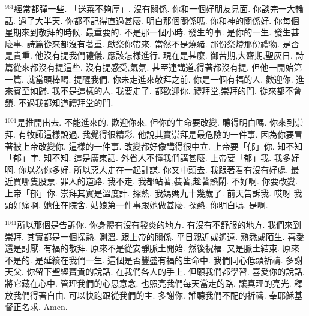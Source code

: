 \documentclass{book}
\begin{document}
$^{961}$經常都彈一些.
「送菜不夠厚」.
沒有關係.
你和一個好朋友見面.
你談完一大輪話.
過了大半天.
你都不記得直過甚麼.
明白那個關係嗎.
你和神的關係好.
你每個星期來到敬拜的時候.
最重要的.
不是那一個小時.
發生的事.
是你的一生.
發生甚麼事.
詩篇從來都沒有著重.
獻祭你帶來.
當然不是燒豬.
那份祭燈那份禮物.
是否是貴重.
他沒有提我們禮儀.
應該怎樣進行.
現在是甚麼.
御苦期,大齋期,聖灰日.
詩篇從來都沒有提這些.
沒有提感受,氣氛.
甚至連講道,得著都沒有提.
但他一開始第一篇.
就當頭棒喝.
提醒我們.
你未走進來敬拜之前.
你是一個有福的人.
歡迎你.
進來賓至如歸.
我不是這樣的人.
我要走了.
都歡迎你.
禮拜堂,崇拜的門.
從來都不會鎖.
不過我都知道禮拜堂的門.

$^{1001}$是推開出去.
不能進來的.
歡迎你來.
但你的生命要改變.
聽得明白嗎.
你來到崇拜.
有牧師這樣說過.
我覺得很精彩.
他說其實崇拜是最危險的一件事.
因為你要冒著被上帝改變你.
這樣的一件事.
改變都好像講得很中立.
上帝要「郁」你.
知不知「郁」字.
知不知.
這是廣東話.
外省人不懂我們講甚麼.
上帝要「郁」我.
我多好啊.
你以為你多好.
所以惡人走在一起計謀.
你又中頭去.
我跟著看有沒有好處.
最近買哪隻股票.
罪人的道路.
我不走.
我都站著,裝著,趁著熱鬧.
不好啊.
你要改變.
上帝「郁」你.
崇拜其實是溫度計.
探熱.
我媽媽九十幾歲了.
前天告訴我.
哎呀 我頭好痛啊.
她住在院舍.
姑娘第一件事跟她做甚麼.
探熱.
你明白嗎.
是啊.

$^{1041}$所以那個是告訴你.
你身體有沒有發炎的地方.
有沒有不舒服的地方.
我們來到崇拜.
其實都是一個探熱.
測溫.
跟上帝的關係.
平日親近或遙遠.
熟悉或陌生.
喜愛還是討厭.
有福的敬拜.
原來不是從安靜脈土開始.
然後祝福.
又是脈土結束.
原來不是的.
是延續在我們一生.
這個是否豐盛有福的生命中.
我們同心低頭祈禱.
多謝天父.
你留下聖經寶貴的說話.
在我們各人的手上.
但願我們都學習.
喜愛你的說話.
將它藏在心中.
管理我們的心思意念.
也照亮我們每天當走的路.
讓真理的亮光.
釋放我們得著自由.
可以快跑跟從我們的主.
多謝你.
誰聽我們不配的祈禱.
奉耶穌基督正名求.
Amen.
\newpage
\end{document}
